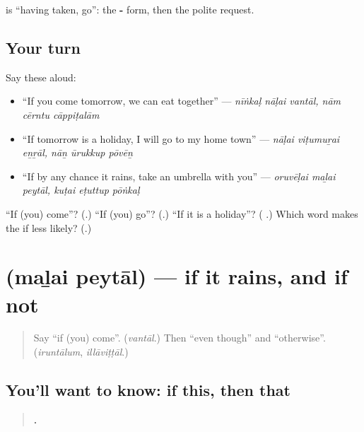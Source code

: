 \textbf{ } is \textquotedblleft{}having taken, go\textquotedblright{}: the \textbf{-} form, then the polite request.

\subsection*{Your turn}
Say these aloud:

\begin{itemize}
\raggedright
  \item \textquotedblleft{}If you come tomorrow, we can eat together\textquotedblright{} — \emph{nīṅkaḷ nāḷai vantāl, nām cērntu cāppiṭalām}
  \item \textquotedblleft{}If tomorrow is a holiday, I will go to my home town\textquotedblright{} — \emph{nāḷai viṭumuṟai eṉṟāl, nāṉ ūrukkup pōvēṉ}
  \item \textquotedblleft{}If by any chance it rains, take an umbrella with you\textquotedblright{} — \emph{oruvēḷai maḻai peytāl, kuṭai eṭuttup pōṅkaḷ}
\end{itemize}

\begin{tcolorbox}[breakable,colback=teal!4,colframe=teal!35!black,title={Before you move on}]
\textquotedblleft{}If (you) come\textquotedblright{}? (\textbf{}.) \textquotedblleft{}If (you) go\textquotedblright{}? (\textbf{}.) \textquotedblleft{}If it is a holiday\textquotedblright{}? (\textbf{ }.) Which word makes the if less likely? (\textbf{}.)
\end{tcolorbox}
\section[\texorpdfstring{\ta{மழை} \ta{பெய்தால்} (maḻai peytāl)}{மழை பெய்தால் (maḻai peytāl)}]{  (maḻai peytāl) — if it rains, and if not}

\label{lesson:TA-C292-malai-peytal}



\begin{quote}
Say \textquotedblleft{}if (you) come\textquotedblright{}. (\emph{vantāl}.) Then \textquotedblleft{}even though\textquotedblright{} and \textquotedblleft{}otherwise\textquotedblright{}. (\emph{iruntālum}, \emph{illāviṭṭāl}.)
\end{quote}

\subsection*{You'll want to know: if this, then that}
\begin{quote}
\textbf{    .}
\end{quote}

